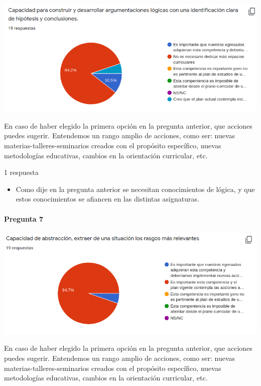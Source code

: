 \documentclass[a4paper,10pt,BCOR10mm,oneside,headsepline]{scrbook}
\begin{document}
\begin{subappendices}
\begin{center}
\includegraphics[scale=.9]{doc06.png}
 \end{center}
 En caso de haber elegido la primera opción en la pregunta anterior, que acciones puedes sugerir. Entendemos un rango amplio de acciones, como ser: nuevas materias-talleres-seminarios creados con el propósito específico, nuevas metodologías educativas, cambios en la orientación curricular, etc. 
 
 1 respuesta

  \begin{itemize}
  \item Como dije en la pregunta anterior se necesitan conocimientos de lógica, y que estos conocimientos se afiancen en las distintas asignaturas. 
  \end{itemize}
 
  
  \paragraph{Pregunta 7}
\begin{center}
 
\includegraphics[scale=.9]{doc07.png}
 \end{center}
 En caso de haber elegido la primera opción en la pregunta anterior, que acciones puedes sugerir. Entendemos un rango amplio de acciones, como ser: nuevas materias-talleres-seminarios creados con el propósito específico, nuevas metodologías educativas, cambios en la orientación curricular, etc. 
 

\end{subappendices}
\end{document}
